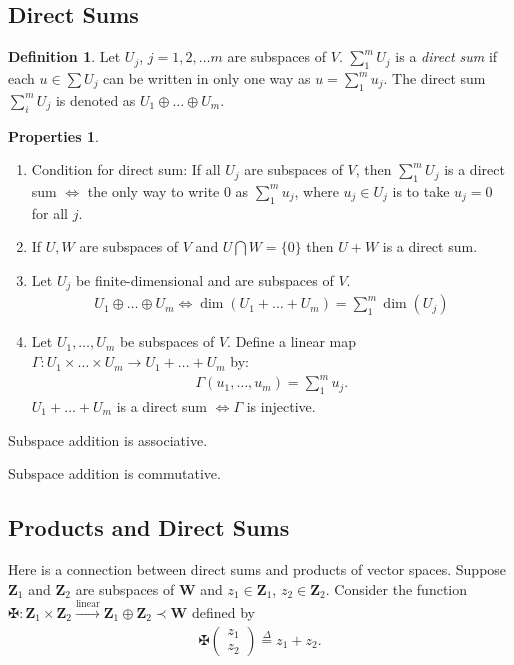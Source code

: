 \documentclass{article}
\theoremstyle{definition}
\newtheorem{defn}{Definition}[section]
\newtheorem{prop}{Properties}[section]
\newcommand{\W}{\mathbf{W}}
\newcommand{\Z}{\mathbf{Z}}
\newcommand{\lin}{\overset{\text{linear}}{\longrightarrow}}
\begin{document}
\subsection{Direct Sums}
\begin{defn}
	Let $U_j$, $j=1,2,\dots m$ are subspaces of $V$. $\sum_1^m U_j$ is a \textit{direct sum} if each $u \in \sum U_j$ can be written in only one way as $u = \sum_1^m u_j$. The direct sum $\sum^m_i U_j$ is denoted as $U_1 \oplus\dots\oplus U_m$.
\end{defn}
\begin{prop}
	$\,$
	\begin{enumerate}
		\item Condition for direct sum: If all $U_j$ are subspaces of $V$, then $\sum_1^m U_j$ is a direct sum $\iff$ the only way to write 0 as $\sum_1^m u_j$, where $u_j \in U_j$ is to take $u_j = 0$ for all $j$.  
		\item If $U, W$ are subspaces of $V$ and $U \bigcap W = \{ 0\}$ then $U+W$ is a direct sum. 
		
		\item Let $U_j$ be finite-dimensional and are subspaces of $V$. 
		\begin{align*}
		U_1 \oplus \dots\oplus U_m \iff \dim(U_1+\dots+U_m) = \sum_1^m\dim(U_j)
		\end{align*}
		
		\item Let $U_1,\dots,U_m$ be subspaces of $V$. Define a linear map $\Gamma : U_1\times\dots\times U_m \rightarrow U_1 + \dots + U_m$ by:
		\begin{align*}
		\Gamma(u_1,\dots,u_m) = \sum_1^m u_j.
		\end{align*}
		$U_1 + \dots + U_m$ is a direct sum $\iff \Gamma$ is injective. 
	\end{enumerate}


		\item Subspace addition is associative.
		
		\item Subspace addition is commutative.
\end{prop}



\subsection{Products and Direct Sums}


Here is a connection between direct sums and products of vector spaces. Suppose $\Z_1$ and $\Z_2$ are subspaces of $\W$ and $z_1 \in \Z_1$, $z_2 \in \Z_2$. Consider the function $\maltese : \Z_1 \times \Z_2 \lin \Z_1 \oplus \Z_2 \prec \W$ defined by
\begin{align}
\maltese \begin{pmatrix}
z_1\\z_2
\end{pmatrix} \stackrel{\Delta}{=} z_1 + z_2.
\end{align}
\end{document}
